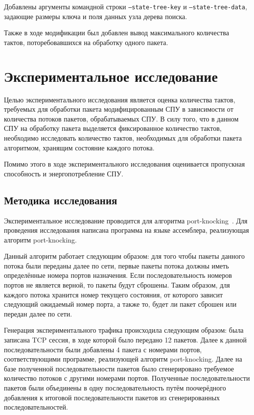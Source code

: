 \documentclass[conference]{IEEEtran}
\begin{document}
Добавлены аргументы командной строки {\tt --state-tree-key} и
{\tt --state-tree-data}, задающие размеры ключа и поля данных узла
дерева поиска.

Также в ходе модификации был добавлен вывод максимального количества тактов,
поторебовавшихся на обработку одного пакета.

\section{Экспериментальное исследование}
Целью экспериментального исследования является оценка количества тактов,
требуемых для обработки пакета модифицированным СПУ в зависимости от
количества потоков пакетов, обрабатываемых СПУ. В силу того, что в данном
СПУ на обработку пакета выделяется фиксированное количество тактов,
необходимо исследовать количество тактов, необходимых для обработки
пакета алгоритмом, хранящим состояние каждого потока.

Помимо этого в ходе экспериментального исследования оценивается
пропускная способность и энергопотребление СПУ.

\subsection{Методика исследования}
Экспериментальное исследование проводится для алгоритма
port-knocking~\cite{bib:Bianchi:OpenState}.
Для проведения исследования написана программа на языке ассемблера,
реализующая алгоритм port-knocking.

Данный алгоритм работает следующим образом: для того чтобы пакеты данного
потока были переданы далее по сети, первые пакеты потока должны
иметь определённые номера портов назначения. Если последовательность номеров
портов не
является верной, то пакеты будут сброшены. Таким образом, для каждого
потока хранится номер текущего состояния, от которого зависит
следующий ожидаемый номер порта, а также то, будет ли пакет сброшен или
передан далее по сети.

Генерация экспериментального трафика происходила следующим образом:
была записана TCP сессия, в ходе которой было передано 12 пакетов.
Далее к данной последовательности были добавлены 4 пакета с номерами портов,
соответствующими программе, реализующей алгоритм port-knocking.
Далее на базе полученной последовательности пакетов было сгенерировано
требуемое количество потоков с другими номерами портов. Полученные
последовательности пакетов были объединены в одну последовательность
путём поочерёдного добавления к итоговой последовательности пакетов из
сгенерированных последовательностей.
\end{document}
